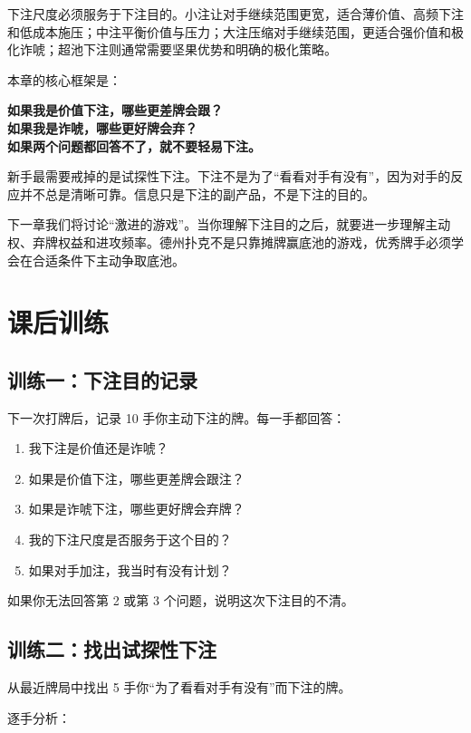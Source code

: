 下注尺度必须服务于下注目的。小注让对手继续范围更宽，适合薄价值、高频下注和低成本施压；中注平衡价值与压力；大注压缩对手继续范围，更适合强价值和极化诈唬；超池下注则通常需要坚果优势和明确的极化策略。

本章的核心框架是：

\begin{center}
\textbf{如果我是价值下注，哪些更差牌会跟？\\
如果我是诈唬，哪些更好牌会弃？\\
如果两个问题都回答不了，就不要轻易下注。}
\end{center}

新手最需要戒掉的是试探性下注。下注不是为了“看看对手有没有”，因为对手的反应并不总是清晰可靠。信息只是下注的副产品，不是下注的目的。

下一章我们将讨论“激进的游戏”。当你理解下注目的之后，就要进一步理解主动权、弃牌权益和进攻频率。德州扑克不是只靠摊牌赢底池的游戏，优秀牌手必须学会在合适条件下主动争取底池。

\section{课后训练}

\subsection*{训练一：下注目的记录}

下一次打牌后，记录 10 手你主动下注的牌。每一手都回答：

\begin{enumerate}
\item 我下注是价值还是诈唬？
\item 如果是价值下注，哪些更差牌会跟注？
\item 如果是诈唬下注，哪些更好牌会弃牌？
\item 我的下注尺度是否服务于这个目的？
\item 如果对手加注，我当时有没有计划？
\end{enumerate}

如果你无法回答第 2 或第 3 个问题，说明这次下注目的不清。

\subsection*{训练二：找出试探性下注}

从最近牌局中找出 5 手你“为了看看对手有没有”而下注的牌。

逐手分析：

